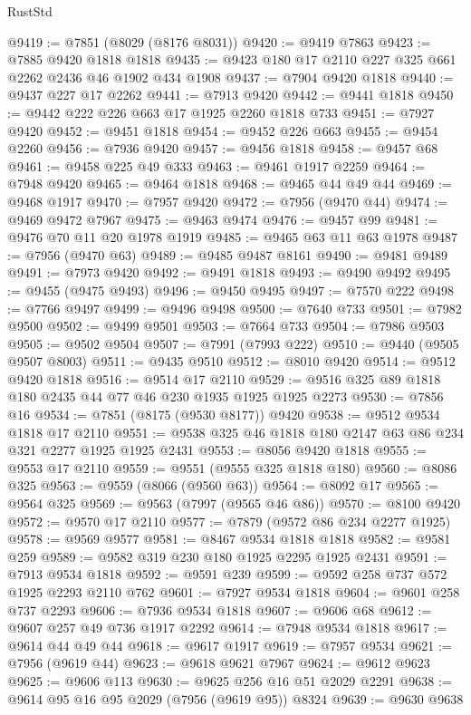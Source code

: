 \begin{lexlean}{RustStd}
\begin{coremodule}
{\begin{coremodule}
{{{{{{{{{{{{{{{{{{{{{{{{{{{{{{{{{{{{{{{{{{{@9419 := @7851 (@8029 (@8176 @8031))
@9420 := @9419 @7863
@9423 := @7885 @9420 @1818 @1818
@9435 := @9423 @180 @17 @2110 @227 @325 @661 @2262 @2436 @46 @1902 @434 @1908
@9437 := @7904 @9420 @1818
@9440 := @9437 @227 @17 @2262
@9441 := @7913 @9420
@9442 := @9441 @1818
@9450 := @9442 @222 @226 @663 @17 @1925 @2260 @1818 @733
@9451 := @7927 @9420
@9452 := @9451 @1818
@9454 := @9452 @226 @663
@9455 := @9454 @2260
@9456 := @7936 @9420
@9457 := @9456 @1818
@9458 := @9457 @68
@9461 := @9458 @225 @49 @333
@9463 := @9461 @1917 @2259
@9464 := @7948 @9420
@9465 := @9464 @1818
@9468 := @9465 @44 @49 @44
@9469 := @9468 @1917
@9470 := @7957 @9420
@9472 := @7956 (@9470 @44)
@9474 := @9469 @9472 @7967
@9475 := @9463 @9474
@9476 := @9457 @99
@9481 := @9476 @70 @11 @20 @1978 @1919
@9485 := @9465 @63 @11 @63 @1978
@9487 := @7956 (@9470 @63)
@9489 := @9485 @9487 @8161
@9490 := @9481 @9489
@9491 := @7973 @9420
@9492 := @9491 @1818
@9493 := @9490 @9492
@9495 := @9455 (@9475 @9493)
@9496 := @9450 @9495
@9497 := @7570 @222
@9498 := @7766 @9497
@9499 := @9496 @9498
@9500 := @7640 @733
@9501 := @7982 @9500
@9502 := @9499 @9501
@9503 := @7664 @733
@9504 := @7986 @9503
@9505 := @9502 @9504
@9507 := @7991 (@7993 @222)
@9510 := @9440 (@9505 @9507 @8003)
@9511 := @9435 @9510
@9512 := @8010 @9420
@9514 := @9512 @9420 @1818
@9516 := @9514 @17 @2110
@9529 := @9516 @325 @89 @1818 @180 @2435 @44 @77 @46 @230 @1935 @1925 @1925 @2273
@9530 := @7856 @16
@9534 := @7851 (@8175 (@9530 @8177)) @9420
@9538 := @9512 @9534 @1818 @17 @2110
@9551 := @9538 @325 @46 @1818 @180 @2147 @63 @86 @234 @321 @2277 @1925 @1925 @2431
@9553 := @8056 @9420 @1818
@9555 := @9553 @17 @2110
@9559 := @9551 (@9555 @325 @1818 @180)
@9560 := @8086 @325
@9563 := @9559 (@8066 (@9560 @63))
@9564 := @8092 @17
@9565 := @9564 @325
@9569 := @9563 (@7997 (@9565 @46 @86))
@9570 := @8100 @9420
@9572 := @9570 @17 @2110
@9577 := @7879 (@9572 @86 @234 @2277 @1925)
@9578 := @9569 @9577
@9581 := @8467 @9534 @1818 @1818
@9582 := @9581 @259
@9589 := @9582 @319 @230 @180 @1925 @2295 @1925 @2431
@9591 := @7913 @9534 @1818
@9592 := @9591 @239
@9599 := @9592 @258 @737 @572 @1925 @2293 @2110 @762
@9601 := @7927 @9534 @1818
@9604 := @9601 @258 @737 @2293
@9606 := @7936 @9534 @1818
@9607 := @9606 @68
@9612 := @9607 @257 @49 @736 @1917 @2292
@9614 := @7948 @9534 @1818
@9617 := @9614 @44 @49 @44
@9618 := @9617 @1917
@9619 := @7957 @9534
@9621 := @7956 (@9619 @44)
@9623 := @9618 @9621 @7967
@9624 := @9612 @9623
@9625 := @9606 @113
@9630 := @9625 @256 @16 @51 @2029 @2291
@9638 := @9614 @95 @16 @95 @2029 (@7956 (@9619 @95)) @8324
@9639 := @9630 @9638
}}}}}}}}}}}}}}}}}}}}}}}}}}}}}}}}}}}}}}}}}}}
\end{coremodule}}
\end{coremodule}
\end{lexlean}
